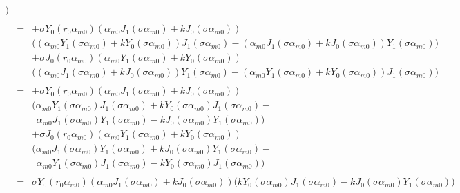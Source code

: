 \documentclass{article}
\begin{document}
\begin{eqnarray}
          \Big)\nonumber\\
\nonumber\\
    &=& + \sigma Y_0(r_0\alpha_{m0})
          (\alpha_{m0}J_1(\sigma\alpha_{m0}) + kJ_0(\sigma\alpha_{m0}))
          \nonumber\\
    & &   \Big(
          (\alpha_{m0}Y_1(\sigma\alpha_{m0}) + kY_0(\sigma\alpha_{m0}))
          J_1(\sigma\alpha_{m0}) -
          (\alpha_{m0}J_1(\sigma\alpha_{m0}) + kJ_0(\sigma\alpha_{m0}))
          Y_1(\sigma\alpha_{m0})
          \Big) \nonumber\\
    & & + \sigma J_0(r_0\alpha_{m0})
          (\alpha_{m0}Y_1(\sigma\alpha_{m0}) + kY_0(\sigma\alpha_{m0}))
          \nonumber\\
    & &   \Big(
          (\alpha_{m0}J_1(\sigma\alpha_{m0}) + kJ_0(\sigma\alpha_{m0}))
          Y_1(\sigma\alpha_{m0}) -
          (\alpha_{m0}Y_1(\sigma\alpha_{m0}) + kY_0(\sigma\alpha_{m0}))
          J_1(\sigma\alpha_{m0})
          \Big)\nonumber\\
\nonumber\\
    &=& + \sigma Y_0(r_0\alpha_{m0})
          (\alpha_{m0}J_1(\sigma\alpha_{m0}) + kJ_0(\sigma\alpha_{m0}))
          \nonumber\\
    & &   \Big(
          \alpha_{m0}Y_1(\sigma\alpha_{m0})J_1(\sigma\alpha_{m0}) +
          kY_0(\sigma\alpha_{m0})J_1(\sigma\alpha_{m0}) -
          \nonumber\\
    & &   \ \  \alpha_{m0}J_1(\sigma\alpha_{m0})Y_1(\sigma\alpha_{m0}) -
          kJ_0(\sigma\alpha_{m0})Y_1(\sigma\alpha_{m0})
          \Big) \nonumber\\
    & & + \sigma J_0(r_0\alpha_{m0})
          (\alpha_{m0}Y_1(\sigma\alpha_{m0}) + kY_0(\sigma\alpha_{m0}))
          \nonumber\\
    & &   \Big(
          \alpha_{m0}J_1(\sigma\alpha_{m0})Y_1(\sigma\alpha_{m0}) +
          kJ_0(\sigma\alpha_{m0})Y_1(\sigma\alpha_{m0}) -
          \nonumber\\
    & &   \ \  \alpha_{m0}Y_1(\sigma\alpha_{m0})J_1(\sigma\alpha_{m0}) -
          kY_0(\sigma\alpha_{m0})J_1(\sigma\alpha_{m0})
          \Big)\nonumber\\
\nonumber\\
    &=&   \sigma Y_0(r_0\alpha_{m0})
          (\alpha_{m0}J_1(\sigma\alpha_{m0}) + kJ_0(\sigma\alpha_{m0}))
          \Big(
          kY_0(\sigma\alpha_{m0})J_1(\sigma\alpha_{m0}) -
          kJ_0(\sigma\alpha_{m0})Y_1(\sigma\alpha_{m0})
          \Big) \nonumber\\

\end{eqnarray}
\end{document}
